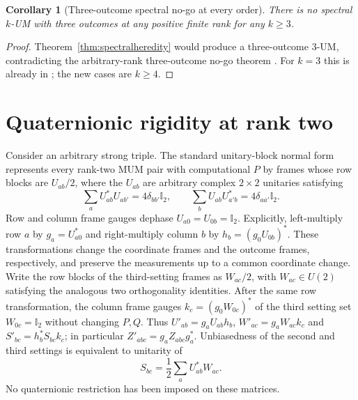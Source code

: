 \documentclass[11pt]{article}
\newtheorem{corollary}[theorem]{Corollary}
\newcommand{\id}{\mathbb I}
\begin{document}
\begin{corollary}[Three-outcome spectral no-go at every order]
\label{cor:spectralthree}
There is no spectral $k$-UM with three outcomes at any positive finite
rank for any $k\geq3$.
\end{corollary}
\begin{proof}
Theorem~\ref{thm:spectralheredity} would produce a three-outcome 3-UM,
contradicting the arbitrary-rank three-outcome no-go theorem \cite[Thm.~5]{DF}.
For $k=3$ this is already in \cite{DF}; the new cases are $k\geq4$.
\end{proof}

\section{Quaternionic rigidity at rank two}
Consider an arbitrary strong triple. The standard
unitary-block normal form \cite{FKN} represents every rank-two MUM pair
with computational $P$ by frames whose row blocks are $U_{ab}/2$,
where the $U_{ab}$ are arbitrary complex $2\times2$ unitaries satisfying
\[
 \sum_a U_{ab}^*U_{ab'}=4\delta_{bb'}\id_2,
 \qquad
 \sum_b U_{ab}U_{a'b}^*=4\delta_{aa'}\id_2.
\]
Row and column frame gauges dephase $U_{a0}=U_{0b}=\id_2$.
Explicitly, left-multiply row $a$ by $g_a=U_{a0}^*$ and right-multiply
column $b$ by $h_b=(g_0U_{0b})^*$. These transformations change the
coordinate frames and the outcome frames, respectively, and preserve the
measurements up to a common coordinate change.
Write the row blocks of the third-setting frames as $W_{ac}/2$, with
$W_{ac}\in U(2)$ satisfying the analogous two orthogonality identities.
After the same row transformation, the column frame gauges
$k_c=(g_0W_{0c})^*$ of the third setting set $W_{0c}=\id_2$ without
changing $P,Q$. Thus $U'_{ab}=g_aU_{ab}h_b$,
$W'_{ac}=g_aW_{ac}k_c$ and $S'_{bc}=h_b^*S_{bc}k_c$;
in particular $Z'_{abc}=g_aZ_{abc}g_a^*$.
Unbiasedness of the second and third settings is equivalent to unitarity of
\[
 S_{bc}=\frac12\sum_a U_{ab}^*W_{ac}.
\]
No quaternionic restriction has been imposed on these matrices.
\end{document}
